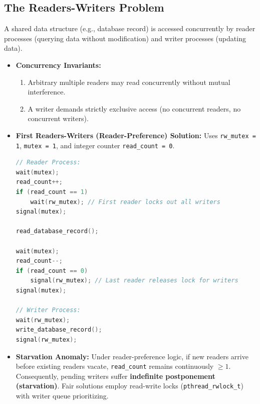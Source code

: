 \subsection{The Readers-Writers Problem}
A shared data structure (e.g., database record) is accessed concurrently by reader processes (querying data without modification) and writer processes (updating data).
\begin{itemize}
    \item \textbf{Concurrency Invariants:}
    \begin{enumerate}
        \item Arbitrary multiple readers may read concurrently without mutual interference.
        \item A writer demands strictly exclusive access (no concurrent readers, no concurrent writers).
    \end{enumerate}
    \item \textbf{First Readers-Writers (Reader-Preference) Solution:}
    Uses \texttt{rw\_mutex = 1}, \texttt{mutex = 1}, and integer counter \texttt{read\_count = 0}.
\begin{lstlisting}[language=C]
// Reader Process:
wait(mutex);
read_count++;
if (read_count == 1)
    wait(rw_mutex); // First reader locks out all writers
signal(mutex);

read_database_record();

wait(mutex);
read_count--;
if (read_count == 0)
    signal(rw_mutex); // Last reader releases lock for writers
signal(mutex);

// Writer Process:
wait(rw_mutex);
write_database_record();
signal(rw_mutex);
\end{lstlisting}
    \item \textbf{Starvation Anomaly:} Under reader-preference logic, if new readers arrive before existing readers vacate, \texttt{read\_count} remains continuously $\ge 1$. Consequently, pending writers suffer \textbf{indefinite postponement (starvation)}. Fair solutions employ read-write locks (\texttt{pthread\_rwlock\_t}) with writer queue prioritizing.
\end{itemize}

